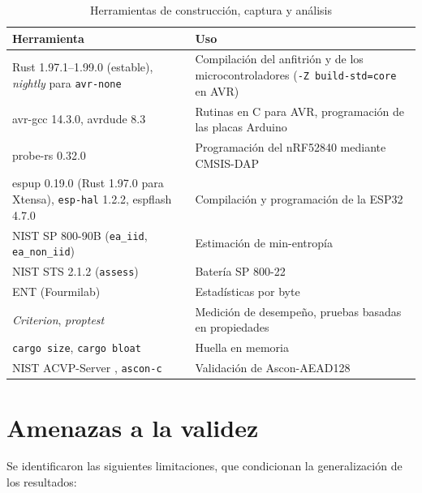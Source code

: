 \begin{table}[H]
\centering
\caption{Herramientas de construcción, captura y análisis}
\label{tab:herramientas}
\begin{tabularx}{\textwidth}{@{}L{0.32\textwidth}Y@{}}
\toprule
\textbf{Herramienta} & \textbf{Uso} \\
\midrule
Rust 1.97.1--1.99.0 (estable), \textit{nightly} para \texttt{avr-none} & Compilación del anfitrión y de los microcontroladores (\texttt{-Z build-std=core} en AVR) \\
avr-gcc 14.3.0, avrdude 8.3 & Rutinas en C para AVR, programación de las placas Arduino \\
probe-rs 0.32.0 & Programación del nRF52840 mediante CMSIS-DAP \\
espup 0.19.0 (Rust 1.97.0 para Xtensa), \texttt{esp-hal} 1.2.2, espflash 4.7.0 & Compilación y programación de la ESP32 \\
NIST SP 800-90B (\texttt{ea\_iid}, \texttt{ea\_non\_iid}) \cite{NISTEntropyAssessment} & Estimación de min-entropía \\
NIST STS 2.1.2 (\texttt{assess}) \cite{Rukhin2010AApplications} & Batería SP 800-22 \\
ENT (Fourmilab) & Estadísticas por byte \\
\textit{Criterion}, \textit{proptest} & Medición de desempeño, pruebas basadas en propiedades \\
\texttt{cargo size}, \texttt{cargo bloat} & Huella en memoria \\
NIST ACVP-Server \cite{NISTACVPServer}, \texttt{ascon-c} \cite{AsconC} & Validación de Ascon-AEAD128 \\
\bottomrule
\end{tabularx}
\end{table}

\section{Amenazas a la validez}

Se identificaron las siguientes limitaciones, que condicionan la generalización de los resultados:

